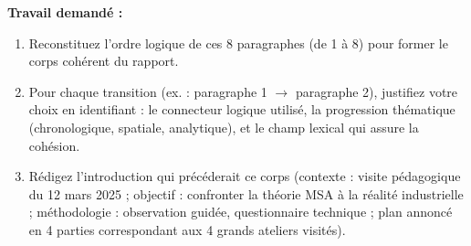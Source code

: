 \documentclass[11pt]{article}
\begin{document}
\begin{exercice}
\textbf{Travail demandé :}
\begin{enumerate}
\item Reconstituez l'ordre logique de ces 8 paragraphes (de 1 à 8) pour former le corps cohérent du rapport.
\item Pour chaque transition (ex. : paragraphe 1 $\to$ paragraphe 2), justifiez votre choix en identifiant : le connecteur logique utilisé, la progression thématique (chronologique, spatiale, analytique), et le champ lexical qui assure la cohésion.
\item Rédigez l'introduction qui précéderait ce corps (contexte : visite pédagogique du 12 mars 2025 ; objectif : confronter la théorie MSA à la réalité industrielle ; méthodologie : observation guidée, questionnaire technique ; plan annoncé en 4 parties correspondant aux 4 grands ateliers visités).
\end{enumerate}
\end{exercice}
\end{document}
